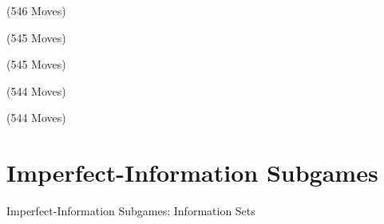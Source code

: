\documentclass{beamer}
\theoremstyle{definition}
\begin{document}
{    \begin{frame}{\chessTitle (546 Moves)}
      \begin{figure}[H]
        \centering
        \showboard
      \end{figure}
    \end{frame}

    \begin{frame}{\chessTitle (545 Moves)}
      \begin{figure}[H]
        \centering
        \showboard
      \end{figure}
    \end{frame}

    \begin{frame}{\chessTitle (545 Moves)}
      \begin{figure}[H]
        \centering
        \showboard
      \end{figure}
    \end{frame}

    \begin{frame}{\chessTitle (544 Moves)}
      \begin{figure}[H]
        \centering
        \showboard
      \end{figure}
    \end{frame}

    \begin{frame}{\chessTitle (544 Moves)}
      \begin{figure}[H]
        \centering
        \showboard
      \end{figure}
      \pause
    \end{frame}
  }

  \section{Imperfect-Information Subgames}
  \begin{frame}{Imperfect-Information Subgames: Information Sets}
    \pause
    \begin{figure}[H]
      \centering
      \scriptsize
      \def\svgwidth{.65\textwidth}
      
    \end{figure}
  \end{frame}
\end{document}
